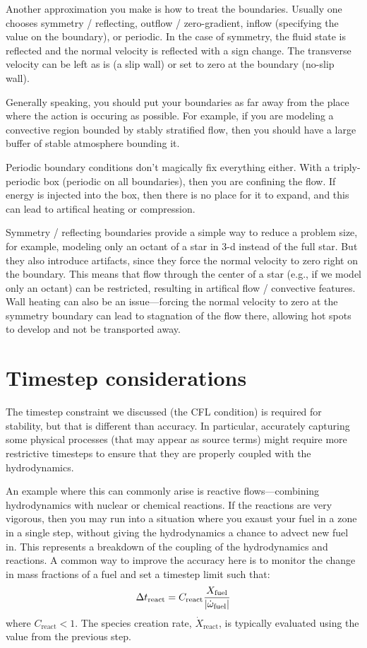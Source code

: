Another approximation you make is how to treat the boundaries.
Usually one chooses symmetry / reflecting, outflow / zero-gradient,
inflow (specifying the value on the boundary), or periodic.  In the
case of symmetry, the fluid state is reflected and the normal velocity
is reflected with a sign change.  The transverse velocity can be left
as is (a slip wall) or set to zero at the boundary (no-slip wall).  

Generally speaking, you should put your boundaries as far away from
the place where the action is occuring as possible.  For example,
if you are modeling a convective region bounded by stably stratified
flow, then you should have a large buffer of stable atmosphere
bounding it.

Periodic boundary conditions don't magically fix everything either.
With a triply-periodic box (periodic on all boundaries), then you are
confining the flow.  If energy is injected into the box, then there is
no place for it to expand, and this can lead to artifical heating or
compression.

Symmetry / reflecting boundaries provide a simple way to reduce a
problem size, for example, modeling only an octant of a star in 3-d
instead of the full star.  But they also introduce artifacts, since
they force the normal velocity to zero right on the boundary.  This
means that flow through the center of a star (e.g., if we model only
an octant) can be restricted, resulting in artifical flow / convective
features.  Wall heating can also be an issue---forcing the normal
velocity to zero at the symmetry boundary can lead to stagnation of
the flow there, allowing hot spots to develop and not be transported
away.






\section{Timestep considerations}

The timestep constraint we discussed (the CFL condition) is required
for stability, but that is different than accuracy.  In particular,
accurately capturing some physical processes (that may appear as
source terms) might require more restrictive timesteps to ensure that they 
are properly coupled with the hydrodynamics.  

An example where this can commonly arise is reactive flows---combining
hydrodynamics with nuclear or chemical reactions.  If the reactions
are very vigorous, then you may run into a situation where you exaust
your fuel in a zone in a single step, without giving the hydrodynamics
a chance to advect new fuel in.  This represents a breakdown of the
coupling of the hydrodynamics and reactions.  A common way to improve
the accuracy here is to monitor the change in mass fractions of a fuel
and set a timestep limit such that:
\begin{equation}
\Delta t_\mathrm{react} = C_\mathrm{react}
\frac{X_\mathrm{fuel}}{|{\dot{\omega}}_\mathrm{fuel}|}
\end{equation}
where $C_\mathrm{react} < 1$.  The species creation rate,
$\dot{X}_\mathrm{react}$, is typically evaluated using the value from
the previous step.


